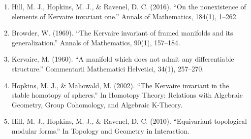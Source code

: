 \begin{enumerate}
\item Hill, M. J., Hopkins, M. J., \& Ravenel, D. C. (2016). ``On the nonexistence of elements of Kervaire invariant one.'' Annals of Mathematics, 184(1), 1--262.
\item Browder, W. (1969). ``The Kervaire invariant of framed manifolds and its generalization.'' Annals of Mathematics, 90(1), 157--184.
\item Kervaire, M. (1960). ``A manifold which does not admit any differentiable structure.'' Commentarii Mathematici Helvetici, 34(1), 257--270.
\item Hopkins, M. J., \& Mahowald, M. (2002). ``The Kervaire invariant in the stable homotopy of spheres.'' In Homotopy Theory: Relations with Algebraic Geometry, Group Cohomology, and Algebraic K-Theory.
\item Hill, M. J., Hopkins, M. J., \& Ravenel, D. C. (2010). ``Equivariant topological modular forms.'' In Topology and Geometry in Interaction.
\end{enumerate}